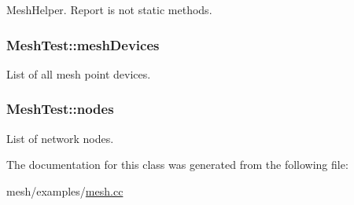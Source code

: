 Mesh\+Helper. Report is not static methods. 

\subsubsection[{\texorpdfstring{mesh\+Devices}{meshDevices}}]{ Mesh\+Test\+::mesh\+Devices\hspace{0.3cm}{\ttfamily [private]}}\hypertarget{classMeshTest_acd25a9d6c8182d166904467148e55445}{}\label{classMeshTest_acd25a9d6c8182d166904467148e55445}


List of all mesh point devices. 

\subsubsection[{\texorpdfstring{nodes}{nodes}}]{ Mesh\+Test\+::nodes\hspace{0.3cm}{\ttfamily [private]}}\hypertarget{classMeshTest_a54656819cec120391cb9cef19fb1c47a}{}\label{classMeshTest_a54656819cec120391cb9cef19fb1c47a}


List of network nodes. 



The documentation for this class was generated from the following file\+:\begin{DoxyCompactItemize}
\item 
mesh/examples/\hyperlink{mesh_8cc}{mesh.\+cc}\end{DoxyCompactItemize}
